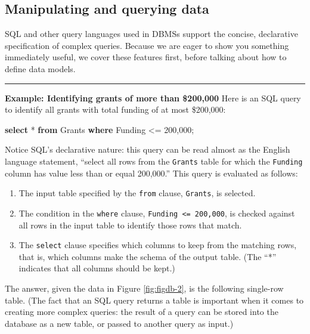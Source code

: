 \documentclass[]{krantz}
\newenvironment{Shaded}{\begin{snugshade}}{\end{snugshade}}
\newcommand{\KeywordTok}[1]{\textcolor[rgb]{0.13,0.29,0.53}{\textbf{#1}}}
\newcommand{\DecValTok}[1]{\textcolor[rgb]{0.00,0.00,0.81}{#1}}
\newcommand{\NormalTok}[1]{#1}
\begin{document}
\hypertarget{sec:db:sql}{\subsection{Manipulating and querying
data}\label{sec:db:sql}}

SQL and other query languages used in DBMSs support the concise,
declarative specification of complex queries. Because we are eager to
show you something immediately useful, we cover these features first,
before talking about how to define data models.

\begin{center}\rule{0.5\linewidth}{\linethickness}\end{center}

\textbf{Example: Identifying grants of more than \$200,000} Here is an
SQL query to identify all grants with total funding of at most
\$200,000:

\begin{Shaded}
\begin{Highlighting}[]
\KeywordTok{select}\NormalTok{ * }\KeywordTok{from}\NormalTok{ Grants}
\KeywordTok{where}\NormalTok{ Funding <= }\DecValTok{200}\NormalTok{,}\DecValTok{000}\NormalTok{;}
\end{Highlighting}
\end{Shaded}

Notice SQL's declarative nature: this query can be read almost as the
English language statement, ``select all rows from the \texttt{Grants}
table for which the \texttt{Funding} column has value less than or equal
200,000.'' This query is evaluated as follows:

\begin{enumerate}
\def\labelenumi{\arabic{enumi}.}
\item
  The input table specified by the \texttt{from} clause,
  \texttt{Grants}, is selected.
\item
  The condition in the \texttt{where} clause,
  \texttt{Funding\ \textless{}=\ 200,000}, is checked against all rows
  in the input table to identify those rows that match.
\item
  The \texttt{select} clause specifies which columns to keep from the
  matching rows, that is, which columns make the schema of the output
  table. (The ``*'' indicates that all columns should be kept.)
\end{enumerate}

The answer, given the data in Figure \ref{fig:figdb-2}, is the following
single-row table. (The fact that an SQL query returns a table is
important when it comes to creating more complex queries: the result of
a query can be stored into the database as a new table, or passed to
another query as input.)
\end{document}
